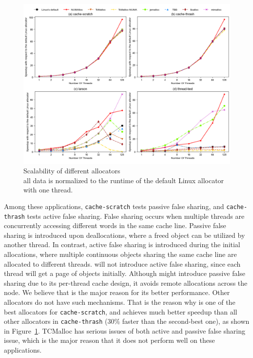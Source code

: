  
\begin{figure}[!th]
    \centering
    \includegraphics[width=\textwidth]{figure/sythentic-scalobility.pdf}
    \caption{Scalability of different allocators\\ all data is normalized to the runtime of the default Linux allocator with one thread.}
    \label{sythentic-scalability}
\end{figure}

Among these applications, \texttt{cache-scratch} tests passive false sharing, and \texttt{cache-thrash} tests active false sharing. False sharing occurs when multiple threads are concurrently accessing different words in the same cache line. 
Passive false sharing is introduced upon deallocations, where a freed object can be utilized by another thread. In contrast, active false sharing is introduced during the initial allocations, where multiple continuous objects sharing the same cache line are allocated to different threads. 
 \NM{} will not introduce active false sharing, since each thread will get a page of objects initially. Although \NM{} might introduce passive false sharing due to its per-thread cache design, it avoids remote allocations across the node. 
 We believe that is the major reason for its better performance. Other allocators do not have such mechanisms. 
 That is the reason why \NM{} is one of the best allocators for \texttt{cache-scratch}, and achieves much better speedup than all other allocators in \texttt{cache-thrash} (30\% faster than the second-best one), as shown in Figure~\ref{sythentic-scalability}. TCMalloc has serious issues of both active and passive false sharing issue, which is the major reason that it does not perform well on these applications.  
 
